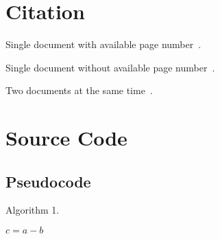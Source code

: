\section{Citation}

Single document with available page number~.

Single document without available page number~.

Two documents at the same time~.

\section{Source Code}

\subsection{Pseudocode}
\begin{algorithm}
\caption{Algorithm 1.}
\label{alg:alg-1}
     {
        $c = a - b$ \;
    }
\end{algorithm}
